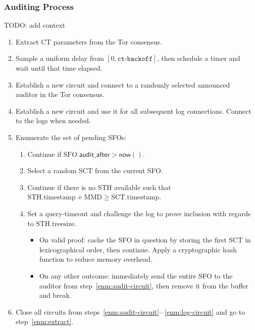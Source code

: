\subsubsection{Auditing Process}
TODO: add context
\begin{enumerate}
	\item\label{enm:extract} Extract CT parameters from the Tor consensus.
	\item\label{enm:backoff} Sample a uniform delay from
			$[0, \texttt{ct-backoff}]$,
		then schedule a timer and wait until that time elapsed.
	\item\label{enm:audit-circuit} Establish a new circuit and connect to a
		randomly selected announced auditor in the Tor consensus.
	\item\label{enm:log-circuit} Establish a new circuit and use it for all
		subsequent log connections.  Connect to the logs when needed.
	\item\label{enm:audit-loop} Enumerate the set of pending SFOs:
		\begin{enumerate}
			\item Continue if
				$\textrm{SFO}.\mathsf{audit\_after} > \mathsf{now}()$.
			\item Select a random SCT from the current SFO.
			\item Continue if there is no STH available such that
					$\textrm{STH.timestamp} + \textrm{MMD} \ge
					\textrm{SCT.timestamp}$.
			\item Set a query-timeout and challenge the log to prove
				inclusion with regards to $\textrm{STH.treesize}$.
				\begin{itemize}
					\item On valid proof: cache the SFO in question by storing
						the first SCT in lexicographical order, then continue.
						Apply a cryptographic hash function to reduce memory
						overhead.
					\item On any other outcome: immediately send the entire SFO
						to the auditor from step~\ref{enm:audit-circuit}, then
						remove it from the buffer and break.
				\end{itemize}
		\end{enumerate}
	\item Close all circuits from steps~\ref{enm:audit-circuit}--%
		\ref{enm:log-circuit} and go to step~\ref{enm:extract}.
\end{enumerate}


